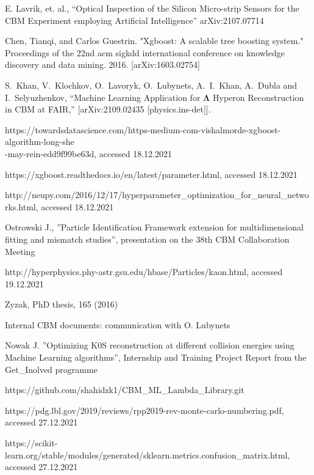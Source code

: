 \begin{thebibliography}{99}
    E. Lavrik, et. al., “Optical Inspection of the Silicon Micro-strip Sensors for the CBM Experiment employing Artificial Intelligence''
    arXiv:2107.07714
    
    Chen, Tianqi, and Carlos Guestrin. "Xgboost: A scalable tree boosting system." Proceedings of the 22nd acm sigkdd international conference on knowledge discovery and data mining. 2016.
    [arXiv:1603.02754]
    
    S.~Khan, V.~Klochkov, O.~Lavoryk, O.~Lubynets, A.~I.~Khan, A.~Dubla and I.~Selyuzhenkov,
    ``Machine Learning Application for $\mathbf{\Lambda}$ Hyperon Reconstruction in CBM at FAIR,''
    [arXiv:2109.02435 [physics.ins-det]].

    
    https://towardsdatascience.com/https-medium-com-vishalmorde-xgboost-algorithm-long-she\\-may-rein-edd9f99be63d, accessed 18.12.2021
    
    https://xgboost.readthedocs.io/en/latest/parameter.html, accessed 18.12.2021
    
    http://neupy.com/2016/12/17/hyperparameter\_optimization\_for\_neural\_networks.html, accessed 18.12.2021
    
    Ostrowski J., ''Particle Identification Framework extension for multidimensional fitting and mismatch studies'', presentation on the 38th CBM Collaboration Meeting
    
    http://hyperphysics.phy-astr.gsu.edu/hbase/Particles/kaon.html, accessed 19.12.2021
    
    Zyzak, PhD thesis, 165 (2016)
    
    Internal CBM documents: communication with O. Lubynets
    
    Nowak J. ''Optimizing K0S reconstruction at different collision energies using Machine Learning algorithms'', Internship and Training Project Report from the Get\_Inolved programme
    
    https://github.com/shahidzk1/CBM\_ML\_Lambda\_Library.git
    
    https://pdg.lbl.gov/2019/reviews/rpp2019-rev-monte-carlo-numbering.pdf, accessed 27.12.2021
    
     https://scikit-learn.org/stable/modules/generated/sklearn.metrics.confusion\_matrix.html, accessed 27.12.2021
    

 


\end{thebibliography}